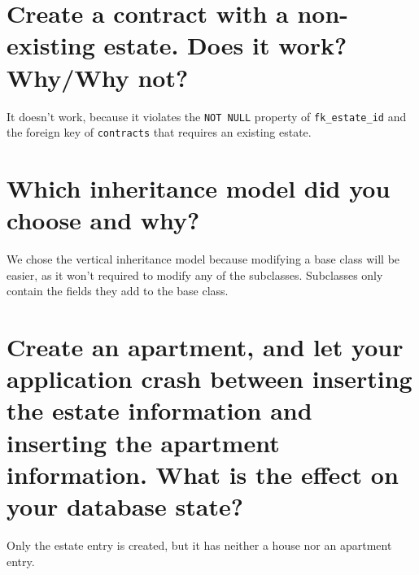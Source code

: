 \documentclass[a4paper,english,abstract=on]{scrartcl}
\begin{document}
\section{Create a contract with a non-existing estate. Does it work? Why/Why not?}
It doesn't work, because it violates the \texttt{NOT NULL} property of \texttt{fk\_estate\_id} and the foreign key of \texttt{contracts} that requires an existing estate.

\section{Which inheritance model did you choose and why?}
We chose the vertical inheritance model because modifying a base class will be easier, as it won't required to modify any of the subclasses. Subclasses only contain the fields they add to the base class.

\section{Create an apartment, and let your application crash between inserting the estate information and inserting the apartment information. What is the effect on your database state?}
Only the estate entry is created, but it has neither a house nor an apartment entry.

\printbibliography
\end{document}
